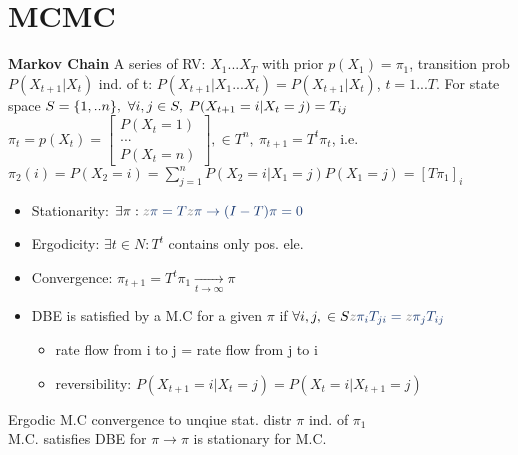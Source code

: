 \section{MCMC}
\textbf{Markov Chain}
A series of RV: $X_{1}...X_{T}$ with prior $p(X_{1})=\pi_{1}$, transition prob $P(X_{t+1} | X_{t})$ ind. of t:
$P(X_{t+1}| X_{1}...X_{t}) = P(X_{t+1}|X_{t})$, $t=1...T$.
For state space $S=\{1,..n\},\ \Forall {i,j \in S} P(X_{t+1}=i| X_{t}=j) = T_{ij}$
$\pi_{t}=p(X_{t})=\begin{bmatrix} P(X_{t}=1) \\ ... \\ P(X_{t}=n) \end{bmatrix}, \in T^{n},\ \pi_{t+1}=T^{t}\pi_{t}$,
i.e. $\pi_{2}(i) = P(X_{2}=i) = \sum_{j=1}^{n}P(X_{2}=i|X_{1}=j)P(X_{1}=j)= \left[T\pi_{1}\right]_{i}$
\begin{itemize}
	\item Stationarity: $\exists \pi: \color{gray}z \color{myblue}\pi = T \color{gray}z \color{myblue}\pi
	\rightarrow (I-T)\pi =0$
	\item Ergodicity: $\exists t \in N: T^{t}$ contains only pos. ele.
	\item Convergence: $\pi_{t+1} = T^{t}\pi_{1} \underset{t \to \infty}{\rightarrow} \pi$
	\item DBE is satisfied by a M.C for a given $\pi$ if $\Forall {i,j} \in S
	\color{gray}z \color{myblue}\pi_{i}T_{ji} = \color{gray}z \color{myblue}\pi_{j}T_{ij}$
	\begin{itemize}
		\item rate flow from i to j = rate flow from j to i
		\item reversibility: $P(X_{t+1}=i|X_{t}=j) = P(X_{t}=i|X_{t+1}=j)$
	\end{itemize}
\end{itemize}
Ergodic M.C convergence to unqiue stat. distr $\pi$ ind. of $\pi_{1}$\\
M.C. satisfies DBE for $\pi \rightarrow \pi$ is stationary for M.C.

